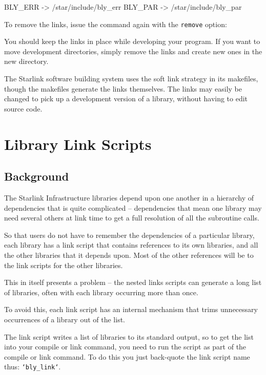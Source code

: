 \documentclass[twoside,11pt,nolof]{starlink}
\begin{document}
\begin{terminalv}
BLY_ERR ->  /star/include/bly_err
BLY_PAR ->  /star/include/bly_par
\end{terminalv}

To remove the links, issue the command again with the \texttt{remove} option:

\begin{terminalv}
\end{terminalv}

You should keep the links in place while developing your program.  If you
want to move development directories, simply remove the links and create
new ones in the new directory.

The Starlink software building system uses the soft link strategy in its
makefiles, though the makefiles generate the links themselves.  The links
may easily be changed to pick up a development version of a library,
without having to edit source code.

\section{Library Link Scripts}
\label{library_link_scripts}

\subsection{Background}
\label{link_scripts_background}

The Starlink Infrastructure libraries depend upon one another in a
hierarchy of dependencies that is quite complicated -- dependencies that
mean one library may need several others at link time to get a full
resolution of all the subroutine calls.

So that users do not have to remember the dependencies of a particular
library, each library has a link script that contains references
to its own libraries, and all the other libraries that it depends upon.
Most of the other references will be to the link scripts for the other
libraries.

This in itself presents a problem -- the nested links scripts can
generate a long list of libraries, often with each library occurring more
than once.

To avoid this, each link script has an internal mechanism that trims
unnecessary occurrences of a library out of the list.

The link script writes a list of libraries to its standard output, so
to get the list into your compile or link command, you need to run the
script as part of the compile or link command.  To do this you just
back-quote the link script name thus: \texttt{`bly\_link`}.
\end{document}
